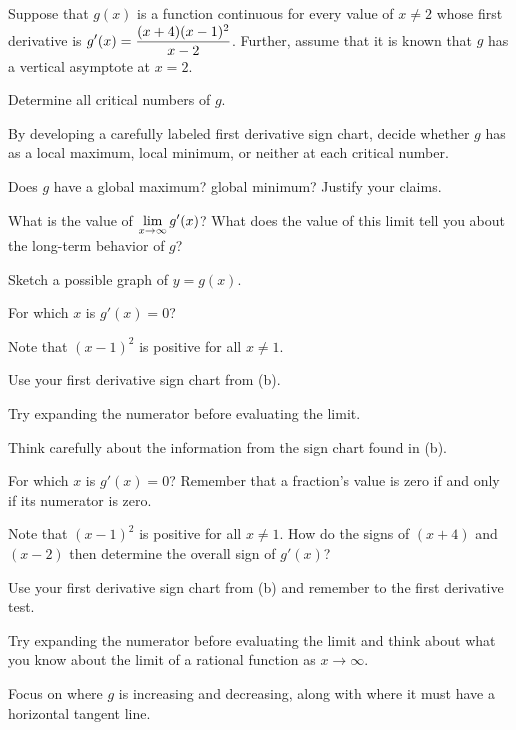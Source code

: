 \begin{activity} \label{A:3.1.1}  Suppose that $g(x)$ is a function continuous for every value of $x \ne 2$ whose first derivative is $\displaystyle g'(x) = \frac{(x+4)(x-1)^2}{x-2}$.  Further, assume that it is known that $g$ has a vertical asymptote at $x = 2$.
\ba
  \item Determine all critical numbers of $g$.
  \item By developing a carefully labeled first derivative sign chart, decide whether $g$ has  as a local maximum, local minimum, or neither at each critical number.
  \item Does $g$ have a global maximum? global minimum? Justify your claims.
  \item What is the value of $\displaystyle \lim_{x \to \infty} g'(x)$?  What does the value of this limit tell you about the long-term behavior of $g$?
  \item Sketch a possible graph of $y = g(x)$.
\ea
\end{activity}
\begin{smallhint}
\ba
	\item For which $x$ is $g'(x) = 0$?
	\item Note that $(x-1)^2$ is positive for all $x \ne 1$.
	\item Use your first derivative sign chart from (b).
	\item Try expanding the numerator before evaluating the limit.
	\item Think carefully about the information from the sign chart found in (b).
\ea
\end{smallhint}
\begin{bighint}
\ba
	\item For which $x$ is $g'(x) = 0$?  Remember that a fraction's value is zero if and only if its numerator is zero.
	\item Note that $(x-1)^2$ is positive for all $x \ne 1$.  How do the signs of $(x+4)$ and $(x-2)$ then determine the overall sign of $g'(x)$?
	\item Use your first derivative sign chart from (b) and remember to the first derivative test.
	\item Try expanding the numerator before evaluating the limit and think about what you know about the limit of a rational function as $x \to \infty$.
	\item Focus on where $g$ is increasing and decreasing, along with where it must have a horizontal tangent line.
\ea
\end{bighint}
